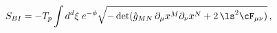 \begin{equation} \label{BornInfeld}
    S_{BI} = -T_p \int d^d \xi \; e^{-\phi} \sqrt{-
    \det(\hat{g}_{MN} \,
    \partial_{\mu} x^M \partial_{\nu}x^N + 2\, \ls^2 \cF_{\mu \nu})}
    \, ,
\end{equation}

